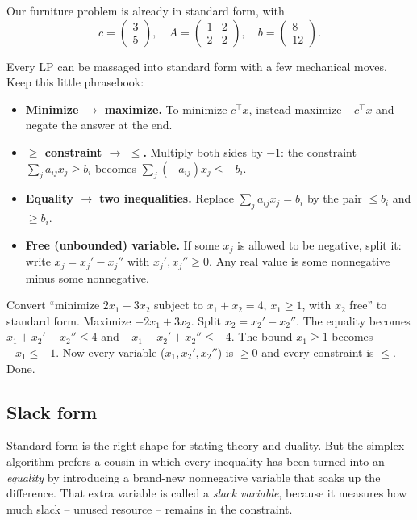 Our furniture problem is already in standard form, with
\[
c = \begin{pmatrix}3\\5\end{pmatrix},\quad
A = \begin{pmatrix}1 & 2\\ 2 & 2\end{pmatrix},\quad
b = \begin{pmatrix}8\\12\end{pmatrix}.
\]

Every LP can be massaged into standard form with a few mechanical moves. Keep
this little phrasebook:

\begin{itemize}
\item \textbf{Minimize $\to$ maximize.} To minimize $c^\top x$, instead
  maximize $-c^\top x$ and negate the answer at the end.
\item \textbf{$\ge$ constraint $\to$ $\le$.} Multiply both sides by $-1$:
  the constraint $\sum_j a_{ij} x_j \ge b_i$ becomes
  $\sum_j (-a_{ij}) x_j \le -b_i$.
\item \textbf{Equality $\to$ two inequalities.} Replace
  $\sum_j a_{ij}x_j = b_i$ by the pair $\le b_i$ and $\ge b_i$.
\item \textbf{Free (unbounded) variable.} If some $x_j$ is allowed to be
  negative, split it: write $x_j = x_j' - x_j''$ with $x_j', x_j'' \ge 0$. Any
  real value is some nonnegative minus some nonnegative.
\end{itemize}

\begin{example}
Convert ``minimize $2x_1 - 3x_2$ subject to $x_1 + x_2 = 4$, $x_1 \ge 1$, with
$x_2$ free'' to standard form. Maximize $-2x_1 + 3x_2$. Split $x_2 = x_2' -
x_2''$. The equality becomes $x_1 + x_2' - x_2'' \le 4$ and
$-x_1 - x_2' + x_2'' \le -4$. The bound $x_1 \ge 1$ becomes $-x_1 \le -1$. Now
every variable ($x_1, x_2', x_2''$) is $\ge 0$ and every constraint is $\le$.
Done.
\end{example}

\subsection{Slack form}

Standard form is the right shape for stating theory and duality. But the
simplex algorithm prefers a cousin in which every inequality has been turned
into an \emph{equality} by introducing a brand-new nonnegative variable that
soaks up the difference. That extra variable is called a \emph{slack
variable}, because it measures how much slack -- unused resource -- remains in
the constraint.

